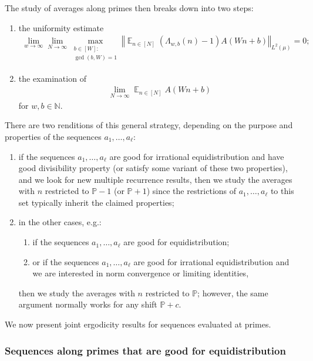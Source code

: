 \documentclass[11pt]{amsart}
\theoremstyle{definition}
\DeclareMathOperator*{\E}{\mathbb{E}}
\newcommand{\N}{{\mathbb N}}
\renewcommand{\P}{{\mathbb P}}
\newcommand{\norm}[1]{\left\Vert #1\right\Vert}
\newcommand{\1}{{\mathbf{1}}}
\newcommand{\BK}[1]{{\color{Apricot}{{#1}}}}
\begin{document}
    The study of averages along primes then breaks down into two steps: %
    \begin{enumerate}
        \item the uniformity estimate 
    \begin{align}\label{E: uniformity estimate for modified Lambda}
        \lim_{w\to\infty}\lim_{N\to\infty}\max_{\substack{b\in[W]\colon\\ \gcd(b,W) = 1}}\norm{\E_{n\in[N]}(\Lambda_{w,b}(n)-1)A(Wn+b)}_{L^2(\mu)} = 0;
    \end{align}
    \item the examination of 
    \begin{align*}
        \lim_{N\to\infty}\E_{n\in[N]}A(Wn+b)
    \end{align*}
    for $w,b\in\N$.
    \end{enumerate}
    
    There are two renditions of this general strategy, depending on the purpose and properties of the sequences $a_1, \ldots, a_\ell$:
    \begin{enumerate}
        \item if the sequences $a_1, \ldots, a_\ell$ are good for irrational equidistribution and have good divisibility property (or satisfy some variant of these two properties), and we look for new multiple recurrence results, then we study the averages with $n$ restricted to $\P-1$ (or $\P+1$) since the restrictions of $a_1, \ldots, a_\ell$ to this set typically inherit the claimed properties;
        \item in the other cases, e.g.:
            \begin{enumerate}
                \item if the sequences $a_1, \ldots, a_\ell$ are good for equidistribution;
                \item or if the sequences $a_1, \ldots, a_\ell$ are good for irrational equidistribution and we are interested in norm convergence or limiting identities,
            \end{enumerate}
            then we study the averages with $n$ restricted to $\P$; however, the same argument normally works for any shift $\P+c$.
    \end{enumerate}
    
    We now present joint ergodicity results for sequences evaluated at primes.
    \subsubsection{Sequences along  primes that are good for equidistribution}
\end{document}
